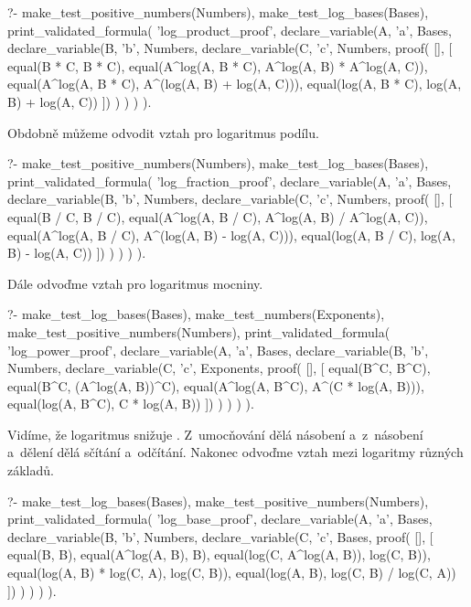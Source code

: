 \begin{prolog}
?-	make_test_positive_numbers(Numbers),
	make_test_log_bases(Bases),
	print_validated_formula(
		'log_product_proof',
		declare_variable(A, 'a', Bases,
			declare_variable(B, 'b', Numbers,
				declare_variable(C, 'c', Numbers,
					proof(
					[],
					[
						equal(B * C, B * C),
						equal(A^log(A, B * C), A^log(A, B) * A^log(A, C)),
						equal(A^log(A, B * C), A^(log(A, B) + log(A, C))),
						equal(log(A, B * C), log(A, B) + log(A, C))
					])
				)
			)
		)
	).				
\end{prolog}

Obdobně můžeme odvodit vztah pro logaritmus podílu.

\begin{prolog}
?-	make_test_positive_numbers(Numbers),
	make_test_log_bases(Bases),
	print_validated_formula(
		'log_fraction_proof',
		declare_variable(A, 'a', Bases,
			declare_variable(B, 'b', Numbers,
				declare_variable(C, 'c', Numbers,
					proof(
					[],
					[
						equal(B / C, B / C),
						equal(A^log(A, B / C), A^log(A, B) / A^log(A, C)),
						equal(A^log(A, B / C), A^(log(A, B) - log(A, C))),
						equal(log(A, B / C), log(A, B) - log(A, C))
					])
				)
			)
		)
	).				
\end{prolog}

Dále odvoďme vztah pro logaritmus mocniny.

\begin{prolog}
?-	make_test_log_bases(Bases),
	make_test_numbers(Exponents),
	make_test_positive_numbers(Numbers),
	print_validated_formula(
		'log_power_proof',
		declare_variable(A, 'a', Bases,
			declare_variable(B, 'b', Numbers,
				declare_variable(C, 'c', Exponents,
					proof(
					[],
					[
						equal(B^C, B^C),
						equal(B^C, (A^log(A, B))^C),
						equal(A^log(A, B^C), A^(C * log(A, B))),
						equal(log(A, B^C), C * log(A, B))
					])
				)
			)
		)
	).				
\end{prolog}

Vidíme, že logaritmus snižuje . Z~umocňování dělá násobení a~z~násobení a~dělení dělá sčítání a~odčítání. Nakonec odvoďme vztah mezi logaritmy různých základů.

\begin{prolog}
?-	make_test_log_bases(Bases),
	make_test_positive_numbers(Numbers),
	print_validated_formula(
		'log_base_proof',
		declare_variable(A, 'a', Bases,
			declare_variable(B, 'b', Numbers,
				declare_variable(C, 'c', Bases,
					proof(
					[],
					[
						equal(B, B),
						equal(A^log(A, B), B),
						equal(log(C, A^log(A, B)), log(C, B)),
						equal(log(A, B) * log(C, A), log(C, B)),
						equal(log(A, B), log(C, B) / log(C, A))
					])
				)
			)
		)
	).				
\end{prolog}


